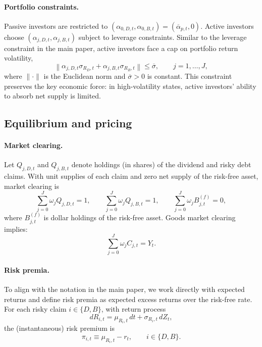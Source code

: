 \documentclass[11pt,english]{article}
\begin{document}
\paragraph{Portfolio constraints.}
Passive investors are restricted to $(\alpha_{0,D,t},\alpha_{0,B,t})=(\overline{\alpha}_{p,t},0)$. Active investors choose $(\alpha_{j,D,t},\alpha_{j,B,t})$ subject to leverage constraints. 
Similar to the leverage constraint in the main paper, active investors face a cap on portfolio return volatility,
\begin{equation}\label{eq:var_constraint_2risky}
    \left\|\alpha_{j,D,t}\sigma_{R_D,t}+\alpha_{j,B,t}\sigma_{R_B,t}\right\|
    \le \overline{\sigma},
    \qquad j=1,\ldots,J,
\end{equation}
where $\|\cdot\|$ is the Euclidean norm and $\overline{\sigma}>0$ is constant. This constraint preserves the key economic force: in high-volatility states, active investors' ability to absorb net supply is limited.

\subsection{Equilibrium and pricing}

\paragraph{Market clearing.}
Let $Q_{j,D,t}$ and $Q_{j,B,t}$ denote holdings (in shares) of the dividend and risky debt claims. With unit supplies of each claim and zero net supply of the risk-free asset, market clearing is
\[
    \sum_{j=0}^J \omega_j Q_{j,D,t}=1,
    \qquad
    \sum_{j=0}^J \omega_j Q_{j,B,t}=1,
    \qquad
    \sum_{j=0}^J \omega_j B^{(f)}_{j,t}=0,
\]
where $B^{(f)}_{j,t}$ is dollar holdings of the risk-free asset. Goods market clearing implies: 
\[\sum_{j=0}^J\omega_j C_{j,t}=Y_t.\]

\paragraph{Risk premia.}
To align with the notation in the main paper, we work directly with expected returns and define risk premia as expected excess returns over the risk-free rate. For each risky claim $i\in\{D,B\}$, with return process
\[
    dR_{i,t}=\mu_{R_i,t}\,dt+\sigma_{R_i,t}\,dZ_t,
\]
the (instantaneous) risk premium is
\begin{equation}\label{eq:premia_def}
    \pi_{i,t}\equiv \mu_{R_i,t}-r_t,
    \qquad i\in\{D,B\}.
\end{equation}
\end{document}

